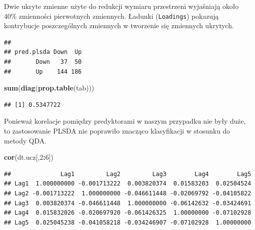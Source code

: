 \documentclass[]{book}
\newenvironment{Shaded}{\begin{snugshade}}{\end{snugshade}}
\newcommand{\DecValTok}[1]{\textcolor[rgb]{0.00,0.00,0.81}{#1}}
\newcommand{\KeywordTok}[1]{\textcolor[rgb]{0.13,0.29,0.53}{\textbf{#1}}}
\newcommand{\NormalTok}[1]{#1}
\newcommand{\OperatorTok}[1]{\textcolor[rgb]{0.81,0.36,0.00}{\textbf{#1}}}
\newcommand{\StringTok}[1]{\textcolor[rgb]{0.31,0.60,0.02}{#1}}
\theoremstyle{plain}
\theoremstyle{definition}
\theoremstyle{definition}
\theoremstyle{definition}
\theoremstyle{definition}
\theoremstyle{remark}
\begin{document}
Dwie ukryte zmienne użyte do redukcji wymiaru przestrzeni wyjaśniają około 40\% zmienności pierwotnych zmiennych. Ładunki (\texttt{Loadings}) pokazują kontrybucje poszczególnych zmiennych w tworzenie się zmiennych ukrytych.

\begin{Shaded}
\end{Shaded}

\begin{verbatim}
##           
## pred.plsda Down  Up
##       Down   37  50
##       Up    144 186
\end{verbatim}

\begin{Shaded}
\begin{Highlighting}[]
\KeywordTok{sum}\NormalTok{(}\KeywordTok{diag}\NormalTok{(}\KeywordTok{prop.table}\NormalTok{(tab)))}
\end{Highlighting}
\end{Shaded}

\begin{verbatim}
## [1] 0.5347722
\end{verbatim}

Ponieważ korelacje pomiędzy predyktorami w naszym przypadku nie były duże, to zastosowanie PLSDA nie poprawiło znacząco klasyfikacji w stosunku do metody QDA.

\begin{Shaded}
\begin{Highlighting}[]
\KeywordTok{cor}\NormalTok{(dt.ucz[,}\DecValTok{2}\OperatorTok{:}\DecValTok{6}\NormalTok{])}
\end{Highlighting}
\end{Shaded}

\begin{verbatim}
##              Lag1         Lag2         Lag3        Lag4        Lag5
## Lag1  1.000000000 -0.001713222  0.003820374  0.01583203  0.02504524
## Lag2 -0.001713222  1.000000000 -0.046611448 -0.02069792 -0.04105822
## Lag3  0.003820374 -0.046611448  1.000000000 -0.06142632 -0.03424691
## Lag4  0.015832026 -0.020697920 -0.061426325  1.00000000 -0.07102928
## Lag5  0.025045238 -0.041058218 -0.034246907 -0.07102928  1.00000000
\end{verbatim}
\end{document}
